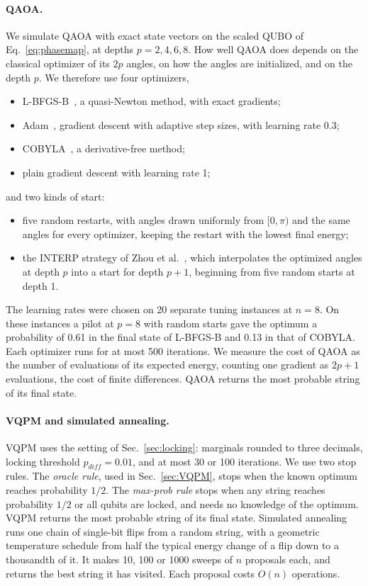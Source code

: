 \documentclass[onecolumn,10pt]{article}
\theoremstyle{remark}
\theoremstyle{plain}
\begin{document}
\paragraph{QAOA.} We simulate QAOA with exact state vectors on the scaled QUBO of Eq.~\eqref{eq:phasemap}, at depths $p=2,4,6,8$. How well QAOA does depends on the classical optimizer of its $2p$ angles, on how the angles are initialized, and on the depth $p$. We therefore use four optimizers,
\begin{itemize}[noitemsep]
\item L-BFGS-B~\cite{byrd1995limited}, a quasi-Newton method, with exact gradients;
\item Adam~\cite{kingma2015adam}, gradient descent with adaptive step sizes, with learning rate 0.3;
\item COBYLA~\cite{powell1994direct}, a derivative-free method;
\item plain gradient descent with learning rate 1;
\end{itemize}
and two kinds of start:
\begin{itemize}[noitemsep]
\item five random restarts, with angles drawn uniformly from $[0,\pi)$ and the same angles for every optimizer, keeping the restart with the lowest final energy;
\item the INTERP strategy of Zhou et al.~\cite{zhou2020quantum}, which interpolates the optimized angles at depth $p$ into a start for depth $p+1$, beginning from five random starts at depth 1.
\end{itemize}
The learning rates were chosen on 20 separate tuning instances at $n=8$. On these instances a pilot at $p=8$ with random starts gave the optimum a probability of 0.61 in the final state of L-BFGS-B and 0.13 in that of COBYLA. Each optimizer runs for at most 500 iterations. We measure the cost of QAOA as the number of evaluations of its expected energy, counting one gradient as $2p+1$ evaluations, the cost of finite differences. QAOA returns the most probable string of its final state.

\paragraph{VQPM and simulated annealing.} VQPM uses the setting of Sec.~\ref{sec:locking}: marginals rounded to three decimals, locking threshold $p_{diff}=0.01$, and at most 30 or 100 iterations. We use two stop rules. The \emph{oracle rule}, used in Sec.~\ref{sec:VQPM}, stops when the known optimum reaches probability $1/2$. The \emph{max-prob rule} stops when any string reaches probability $1/2$ or all qubits are locked, and needs no knowledge of the optimum. VQPM returns the most probable string of its final state. Simulated annealing runs one chain of single-bit flips from a random string, with a geometric temperature schedule from half the typical energy change of a flip down to a thousandth of it. It makes 10, 100 or 1000 sweeps of $n$ proposals each, and returns the best string it has visited. Each proposal costs $O(n)$ operations.
\end{document}
